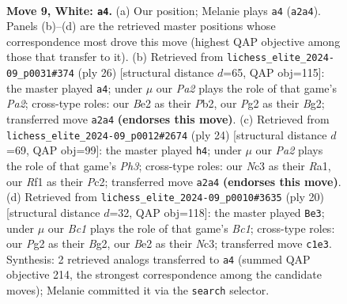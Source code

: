 \documentclass[11pt]{article}
\begin{document}
\clearpage

\begin{figure}[p]\centering
\begin{subfigure}{0.46\textwidth}\centering
\resizebox{\linewidth}{!}{%
\newchessgame
\chessboard[
  setfen={rn1qk2r/1p2bppp/p2pbn2/4p3/4P3/2N2N2/PPP1BPPP/R1BQ1RK1 w kq - 4 9},
  showmover=false,
  pgfstyle=straightmove, color=movearrow, markmove={a2-a4}
]}
\caption{}
\end{subfigure}\hfill
\begin{subfigure}{0.46\textwidth}\centering
\resizebox{\linewidth}{!}{%
\newchessgame
\chessboard[
  setfen={r2qk2r/4bpp1/p1npbn2/1p2p3/4P3/2N1N1P1/PPP2PB1/R1BQ1RK1 w kq - 1 14},
  showmover=false,
  pgfstyle=straightmove, color=movearrow, markmove={a2-a4}
]}
\caption{}
\end{subfigure}
\\[4pt]
\begin{subfigure}{0.46\textwidth}\centering
\resizebox{\linewidth}{!}{%
\newchessgame
\chessboard[
  setfen={rn1qk2r/4bpp1/p2pb3/1p2p1Pn/4P3/2N4P/PPP1N1B1/R1BQK2R w KQkq - 1 13},
  showmover=false,
  pgfstyle=straightmove, color=movearrow, markmove={h3-h4}
]}
\caption{}
\end{subfigure}\hfill
\begin{subfigure}{0.46\textwidth}\centering
\resizebox{\linewidth}{!}{%
\newchessgame
\chessboard[
  setfen={rn1qk2r/4bpp1/p2pbn2/1p2p2p/4P3/2N3PP/PPP1NPB1/R1BQ1RK1 w kq - 2 11},
  showmover=false,
  pgfstyle=straightmove, color=movearrow, markmove={c1-e3}
]}
\caption{}
\end{subfigure}
\caption{\textbf{Move 9, White: \texttt{a4}.} (a) Our position; Melanie plays \texttt{a4} (\texttt{a2a4}). Panels (b)--(d) are the retrieved master positions whose correspondence most drove this move (highest QAP objective among those that transfer to it). (b) Retrieved from \texttt{lichess\_elite\_2024-09\_p0031\#374} (ply 26) [structural distance $d$=65, QAP obj=115]: the master played \texttt{a4}; under $\mu$ our \emph{Pa2} plays the role of that game's \emph{Pa2}; cross-type roles: our \emph{B}e2 as their \emph{P}b2, our \emph{P}g2 as their \emph{B}g2; transferred move \texttt{a2a4} \textbf{(endorses this move)}. (c) Retrieved from \texttt{lichess\_elite\_2024-09\_p0012\#2674} (ply 24) [structural distance $d$=69, QAP obj=99]: the master played \texttt{h4}; under $\mu$ our \emph{Pa2} plays the role of that game's \emph{Ph3}; cross-type roles: our \emph{N}c3 as their \emph{R}a1, our \emph{R}f1 as their \emph{P}c2; transferred move \texttt{a2a4} \textbf{(endorses this move)}. (d) Retrieved from \texttt{lichess\_elite\_2024-09\_p0010\#3635} (ply 20) [structural distance $d$=32, QAP obj=118]: the master played \texttt{Be3}; under $\mu$ our \emph{Bc1} plays the role of that game's \emph{Bc1}; cross-type roles: our \emph{P}g2 as their \emph{B}g2, our \emph{B}e2 as their \emph{N}c3; transferred move \texttt{c1e3}. Synthesis: 2 retrieved analogs transferred to \texttt{a4} (summed QAP objective 214, the strongest correspondence among the candidate moves); Melanie committed it via the \texttt{search} selector.}
\label{fig:thought-m16}
\end{figure}
\end{document}
